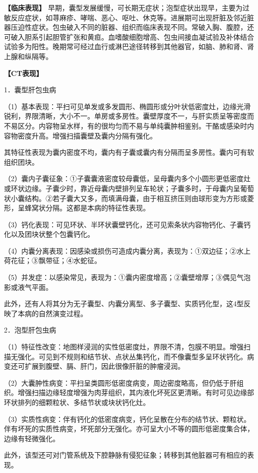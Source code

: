\textbf{【临床表现】}
早期，囊型发展缓慢，可长期无症状；泡型症状出现早，主要为过敏反应症状，如荨麻疹、哮喘、恶心、呕吐、休克等。进展期可出现肝脏及邻近脏器压迫性症状。包虫破入不同的脏器、组织而临床表现不同。常破入胸、腹腔，还可破入胆系引起胆管扩张和黄疸。血嗜酸细胞增高、包虫间接血凝试验及补体结合试验多为阳性。晚期常可经过血行或淋巴途径转移到其他器官，如脑、肺和肾、肾上腺和纵隔等。

\textbf{【CT表现】}

1．囊型肝包虫病

（1）基本表现：平扫可见单发或多发圆形、椭圆形或分叶状低密度灶，边缘光滑锐利，界限清晰，大小不一。单房或多房性。囊壁厚度不一，与肝实质呈等密度而不易区分。内容物呈水样，有的很均匀而不易与单纯囊肿相鉴别。干酪或感染时内容物密度升高。增强扫描囊壁及囊内分隔有强化。

其特征性表现为囊内密度不均，囊内有子囊或囊内有分隔而呈多房性。囊内可有软组织团块。

（2）囊内子囊征象：①子囊囊液密度较母囊低，呈母囊内多个小圆形更低密度灶或环状边缘。子囊少时，靠近母囊内壁排列呈车轮状；子囊多时，于母囊内呈葡萄状小囊结构。②若子囊大又多，而填满母囊，由于相互挤压则由球形变为方形或菱形，呈蜂窝状分隔。这都是本病的特征性表现。

（3）钙化表现：可见环状、半环状囊壁钙化，还可见索条状内容物钙化、子囊钙化以及团块状整个包囊钙化。

（4）内囊分离表现：因感染或损伤可造成内囊分离，表现为：①双边征；②水上荷花征；③飘带征；④水蛇征。

（5）并发症：以感染常见，表现为：①囊内密度增高；②囊壁增厚；③偶见气泡影或液气平面。

此外，还有人将其分为无子囊型、内囊分离型、多子囊型、实质钙化型，这4型反映了本病的自然演变过程。

2．泡型肝包虫病

（1）特征性改变：地图样浸润的实性低密度灶，界限不清，包膜不明显。增强扫描无强化。可见到不规则和结节状、点状丛集钙化，而不像囊型多呈环状钙化。病变还可扩展到腹壁、膈、肝门，因此很像肝脏的肿瘤浸润。

（2）大囊肿性病变：平扫呈类圆形低密度病变，周边密度略高，但仍低于肝组织。增强扫描边缘轻度增强为肉芽组织，其内液化坏死区更清晰。有时可见边缘部环状排列的细颗粒状、多结节状或块状钙化灶。

（3）实质性病变：伴有钙化的低密度病变，钙化呈散在分布的结节状、颗粒状。伴有坏死的实质性病变，坏死部分无强化。亦可呈大小不等的圆形低密度集合体，边缘有轻微强化。

此外，该型还可对门管系统及下腔静脉有侵犯征象；转移到其他脏器可有相应的表现。

